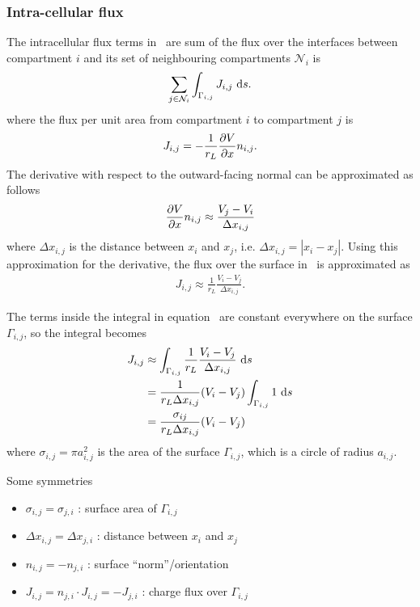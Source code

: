 \subsubsection{Intra-cellular flux}
The intracellular flux terms in~ are sum of the flux over the interfaces between compartment $i$ and its set of neighbouring compartments $\mathcal{N}_i$ is
\begin{equation}
    \sum_{j\in\mathcal{N}_i} { \int_{\Gamma_{i,j}} { J_{i,j} ~\text{d}{s} } }.
\end{equation}
where the flux per unit area from compartment $i$ to compartment $j$ is
\begin{align}
    J_{i,j} = - \frac{1}{r_L}\frac{\partial{V}}{\partial{x}} n_{i,j}.
    \label{eq:J_ij_exact}
\end{align}
The derivative with respect to the outward-facing normal can be approximated as follows
\begin{equation*}
    \frac{\partial{V}}{\partial{x}} n_{i,j} \approx \frac{V_j - V_i}{\Delta x_{i,j}}
\end{equation*}
where $\Delta x_{i,j}$ is the distance between $x_i$ and $x_j$, i.e. $\Delta x_{i,j}=|x_i-x_j|$.
Using this approximation for the derivative, the flux over the surface in~ is approximated as
\begin{align}
    J_{i,j} \approx \frac{1}{r_L}\frac{V_i - V_j}{\Delta x_{i,j}}.
    \label{eq:J_ij_intermediate}
\end{align}

The terms inside the integral in equation~ are constant everywhere on the surface $\Gamma_{i,j}$, so the integral becomes
\begin{align}
  J_{i,j} &\approx \int_{\Gamma_{i,j}}  \frac{1}{r_L}\frac{V_i-V_j}{\Delta x_{i,j}} ~\text{d}{s} \nonumber \\
          &= \frac{1}{r_L \Delta x_{i,j}}(V_i-V_j) \int_{\Gamma_{i,j}} 1 ~\text{d}{s} \nonumber \\
          &= \frac{\sigma_{ij}}{r_L \Delta x_{i,j}}(V_i-V_j) \nonumber \\
          \label{eq:J_ij}
\end{align}
where $\sigma_{i,j}=\pi a_{i,j}^2$ is the area of the surface $\Gamma_{i,j}$, which is a circle of radius $a_{i,j}$.

Some symmetries
\begin{itemize}
    \item $\sigma_{i,j}=\sigma_{j,i}$ : surface area of $\Gamma_{i,j}$
    \item $\Delta x_{i,j}=\Delta x_{j,i}$ : distance between $x_i$ and $x_j$
    \item $n_{i,j}=-n_{j,i}$ : surface ``norm''/orientation
    \item $J_{i,j}=n_{j,i}\cdot J_{i,j}=-J_{j,i}$ : charge flux over $\Gamma_{i,j}$
\end{itemize}

